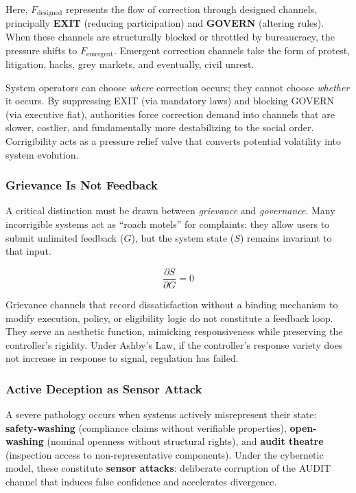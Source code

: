 Here, $F_{\text{designed}}$ represents the flow of correction through designed channels, principally \textbf{EXIT} (reducing participation) and \textbf{GOVERN} (altering rules). When these channels are structurally blocked or throttled by bureaucracy, the pressure shifts to $F_{\text{emergent}}$. Emergent correction channels take the form of protest, litigation, hacks, grey markets, and eventually, civil unrest.

System operators can choose \textit{where} correction occurs; they cannot choose \textit{whether} it occurs. By suppressing EXIT (via mandatory laws) and blocking GOVERN (via executive fiat), authorities force correction demand into channels that are slower, costlier, and fundamentally more destabilizing to the social order. Corrigibility acts as a pressure relief valve that converts potential volatility into system evolution.

\subsubsection{Grievance Is Not Feedback}
\label{subsec:grievance}

A critical distinction must be drawn between \textit{grievance} and \textit{governance}. Many incorrigible systems act as ``roach motels'' for complaints: they allow users to submit unlimited feedback ($G$), but the system state ($S$) remains invariant to that input.

\begin{equation}
\frac{\partial S}{\partial G} = 0
\label{eq:grievance}
\end{equation}

Grievance channels that record dissatisfaction without a binding mechanism to modify execution, policy, or eligibility logic do not constitute a feedback loop. They serve an aesthetic function, mimicking responsiveness while preserving the controller's rigidity. Under Ashby's Law, if the controller's response variety does not increase in response to signal, regulation has failed.

\subsubsection{Active Deception as Sensor Attack}
\label{subsec:active-deception}

A severe pathology occurs when systems actively misrepresent their state: \textbf{safety-washing} (compliance claims without verifiable properties), \textbf{open-washing} (nominal openness without structural rights), and \textbf{audit theatre} (inspection access to non-representative components). Under the cybernetic model, these constitute \textbf{sensor attacks}: deliberate corruption of the AUDIT channel that induces false confidence and accelerates divergence.

